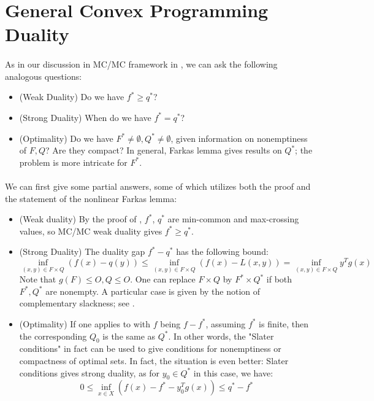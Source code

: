 \section{General Convex Programming Duality}
\label{sect:042}

\paragraph{}As in our discussion in MC/MC framework in , we can ask the following analogous questions:
\begin{itemize}
	\item (Weak Duality) Do we have $f^\ast\geq q^\ast$?
	\item (Strong Duality) When do we have $f^\ast=q^\ast$?
	\item (Optimality) Do we have $F^\ast\neq\emptyset,Q^\ast\neq\emptyset$, given information on nonemptiness of $F,Q$? Are they compact? In general, Farkas lemma gives results on $Q^\ast$; the problem is more intricate for $F^\ast$.
\end{itemize}

\paragraph{}We can first give some partial answers, some of which utilizes both the proof and the statement of the nonlinear Farkas lemma:
\begin{itemize}
	\item (Weak duality) By the proof of , $f^\ast$, $q^\ast$ are min-common and max-crossing values, so MC/MC weak duality gives $f^\ast\geq q^\ast$.
	\item (Strong Duality) The duality gap $f^\ast-q^\ast$ has the following bound:
	      \[
		      \underset{(x,y)\in F\times Q}{\operatorname{inf}}\left(f(x)-q(y)\right)\leq
		      \underset{(x,y)\in F\times Q}{\operatorname{inf}}\left(f(x)-L(x,y)\right)=
		      \underset{(x,y)\in F\times Q}{\operatorname{inf}}y^Tg(x)
	      \]
	      Note that $g(F)\leq O,Q\leq O$. One can replace $F\times Q$ by $F^\ast\times Q^\ast$ if both $F^\ast,Q^\ast$ are nonempty. A particular case is given by the notion of complementary slackness; see .
	\item (Optimality) If one applies  to  with $f$ being $f-f^\ast$, assuming $f^\ast$ is finite, then the corresponding $Q_0$ is the same as $Q^\ast$. In other words, the "Slater conditions" in fact can be used to give conditions for nonemptiness or compactness of optimal sets. In fact, the situation is even better: Slater conditions gives strong duality, as for $y_0\in Q^\ast$ in this case, we have:
	      \[
		      0\leq \underset{x\in X}{\operatorname{inf}} \left(f(x)-f^\ast-y_0^T g(x)\right) \leq q^\ast-f^\ast
	      \]
\end{itemize}

